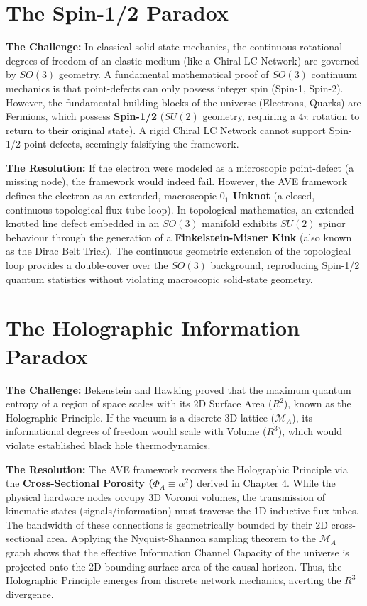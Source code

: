 \section{The Spin-1/2 Paradox}
\textbf{The Challenge:} In classical solid-state mechanics, the continuous rotational degrees of freedom of an elastic medium (like a Chiral LC Network) are governed by $SO(3)$ geometry. A fundamental mathematical proof of $SO(3)$ continuum mechanics is that point-defects can only possess integer spin (Spin-1, Spin-2). However, the fundamental building blocks of the universe (Electrons, Quarks) are Fermions, which possess \textbf{Spin-1/2} ($SU(2)$ geometry, requiring a $4\pi$ rotation to return to their original state). A rigid Chiral LC Network cannot support Spin-1/2 point-defects, seemingly falsifying the framework.

\textbf{The Resolution:} If the electron were modeled as a microscopic point-defect (a missing node), the framework would indeed fail. However, the AVE framework defines the electron as an extended, macroscopic \textbf{$0_1$ Unknot} (a closed, continuous topological flux tube loop). In topological mathematics, an extended knotted line defect embedded in an $SO(3)$ manifold exhibits $SU(2)$ spinor behaviour through the generation of a \textbf{Finkelstein-Misner Kink} (also known as the Dirac Belt Trick). The continuous geometric extension of the topological loop provides a double-cover over the $SO(3)$ background, reproducing Spin-1/2 quantum statistics without violating macroscopic solid-state geometry.

\section{The Holographic Information Paradox}
\textbf{The Challenge:} Bekenstein and Hawking proved that the maximum quantum entropy of a region of space scales with its 2D Surface Area ($R^2$), known as the Holographic Principle. If the vacuum is a discrete 3D lattice ($\mathcal{M}_A$), its informational degrees of freedom would scale with Volume ($R^3$), which would violate established black hole thermodynamics.

\textbf{The Resolution:} The AVE framework recovers the Holographic Principle via the \textbf{Cross-Sectional Porosity ($\Phi_A \equiv \alpha^2$)} derived in Chapter 4. While the physical hardware nodes occupy 3D Voronoi volumes, the transmission of kinematic states (signals/information) must traverse the 1D inductive flux tubes. The bandwidth of these connections is geometrically bounded by their 2D cross-sectional area. Applying the Nyquist-Shannon sampling theorem to the $\mathcal{M}_A$ graph shows that the effective Information Channel Capacity of the universe is projected onto the 2D bounding surface area of the causal horizon. Thus, the Holographic Principle emerges from discrete network mechanics, averting the $R^3$ divergence.

